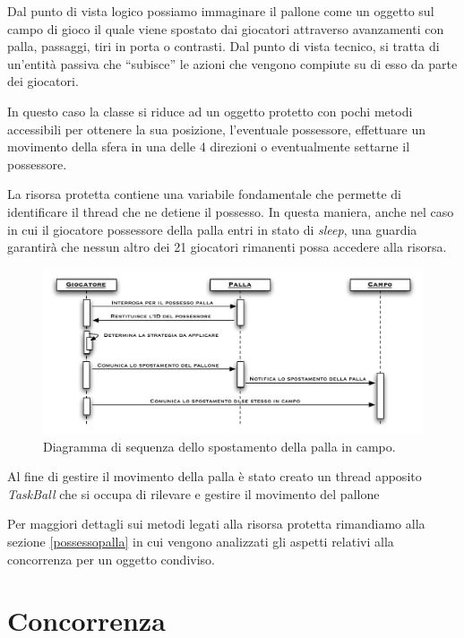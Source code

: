 \documentclass[aps,letterpaper,10pt]{article}
\begin{document}
Dal punto di vista logico possiamo immaginare il pallone come un oggetto sul campo di gioco il quale viene spostato dai
giocatori attraverso avanzamenti con palla, passaggi, tiri in porta o contrasti. Dal punto di vista tecnico, si tratta
di un'entit\`a passiva che ``subisce'' le azioni che vengono compiute su di esso da parte dei giocatori. \vspace{3mm}

In questo caso la classe si riduce ad un oggetto protetto con pochi metodi accessibili per ottenere la sua posizione,
l'eventuale possessore, effettuare un movimento della sfera in una delle 4 direzioni o eventualmente settarne il
possessore. \vspace{3mm}

La risorsa protetta contiene una variabile fondamentale che permette di identificare il thread che ne detiene il
possesso. In questa maniera, anche nel caso in cui il giocatore possessore della palla entri in stato di \emph{sleep},
una guardia garantir\`a che nessun altro dei 21 giocatori rimanenti possa accedere alla risorsa. \vspace{3mm}

\begin{figure}[H]
	\begin{center}
		\includegraphics[width=440px]{images/ball-movement.pdf}
	\end{center}
\caption{Diagramma di sequenza dello spostamento della palla in campo.}
\end{figure}

Al fine di gestire il movimento della palla \`e stato creato un thread apposito \emph{TaskBall} che si occupa di
rilevare e gestire il movimento del pallone

Per maggiori dettagli sui metodi legati alla risorsa protetta rimandiamo alla sezione \ref{possessopalla} in cui vengono
analizzati gli aspetti relativi alla concorrenza per un oggetto condiviso.

\newpage

\section{Concorrenza}
\label{concorrenza}
\end{document}
